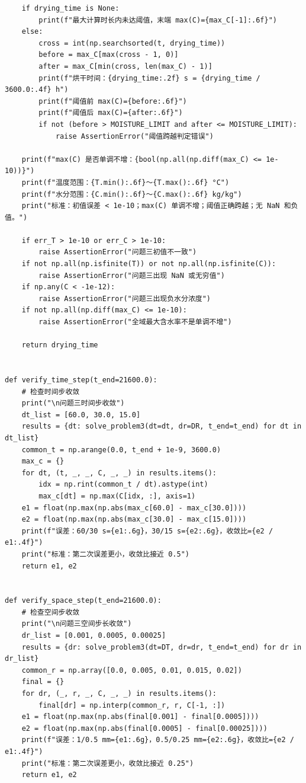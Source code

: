 \documentclass[withoutpreface,bwprint]{cumcm_thesis}
\begin{document}
\begin{appendices}
\begin{lstlisting}
    if drying_time is None:
        print(f"最大计算时长内未达阈值，末端 max(C)={max_C[-1]:.6f}")
    else:
        cross = int(np.searchsorted(t, drying_time))
        before = max_C[max(cross - 1, 0)]
        after = max_C[min(cross, len(max_C) - 1)]
        print(f"烘干时间：{drying_time:.2f} s = {drying_time / 3600.0:.4f} h")
        print(f"阈值前 max(C)={before:.6f}")
        print(f"阈值后 max(C)={after:.6f}")
        if not (before > MOISTURE_LIMIT and after <= MOISTURE_LIMIT):
            raise AssertionError("阈值跨越判定错误")

    print(f"max(C) 是否单调不增：{bool(np.all(np.diff(max_C) <= 1e-10))}")
    print(f"温度范围：{T.min():.6f}～{T.max():.6f} °C")
    print(f"水分范围：{C.min():.6f}～{C.max():.6f} kg/kg")
    print("标准：初值误差 < 1e-10；max(C) 单调不增；阈值正确跨越；无 NaN 和负值。")

    if err_T > 1e-10 or err_C > 1e-10:
        raise AssertionError("问题三初值不一致")
    if not np.all(np.isfinite(T)) or not np.all(np.isfinite(C)):
        raise AssertionError("问题三出现 NaN 或无穷值")
    if np.any(C < -1e-12):
        raise AssertionError("问题三出现负水分浓度")
    if not np.all(np.diff(max_C) <= 1e-10):
        raise AssertionError("全域最大含水率不是单调不增")

    return drying_time


def verify_time_step(t_end=21600.0):
    # 检查时间步收敛
    print("\n问题三时间步收敛")
    dt_list = [60.0, 30.0, 15.0]
    results = {dt: solve_problem3(dt=dt, dr=DR, t_end=t_end) for dt in dt_list}
    common_t = np.arange(0.0, t_end + 1e-9, 3600.0)
    max_c = {}
    for dt, (t, _, _, C, _, _) in results.items():
        idx = np.rint(common_t / dt).astype(int)
        max_c[dt] = np.max(C[idx, :], axis=1)
    e1 = float(np.max(np.abs(max_c[60.0] - max_c[30.0])))
    e2 = float(np.max(np.abs(max_c[30.0] - max_c[15.0])))
    print(f"误差：60/30 s={e1:.6g}，30/15 s={e2:.6g}，收敛比={e2 / e1:.4f}")
    print("标准：第二次误差更小，收敛比接近 0.5")
    return e1, e2


def verify_space_step(t_end=21600.0):
    # 检查空间步收敛
    print("\n问题三空间步长收敛")
    dr_list = [0.001, 0.0005, 0.00025]
    results = {dr: solve_problem3(dt=DT, dr=dr, t_end=t_end) for dr in dr_list}
    common_r = np.array([0.0, 0.005, 0.01, 0.015, 0.02])
    final = {}
    for dr, (_, r, _, C, _, _) in results.items():
        final[dr] = np.interp(common_r, r, C[-1, :])
    e1 = float(np.max(np.abs(final[0.001] - final[0.0005])))
    e2 = float(np.max(np.abs(final[0.0005] - final[0.00025])))
    print(f"误差：1/0.5 mm={e1:.6g}，0.5/0.25 mm={e2:.6g}，收敛比={e2 / e1:.4f}")
    print("标准：第二次误差更小，收敛比接近 0.25")
    return e1, e2



\end{lstlisting}
\end{appendices}
\end{document}
